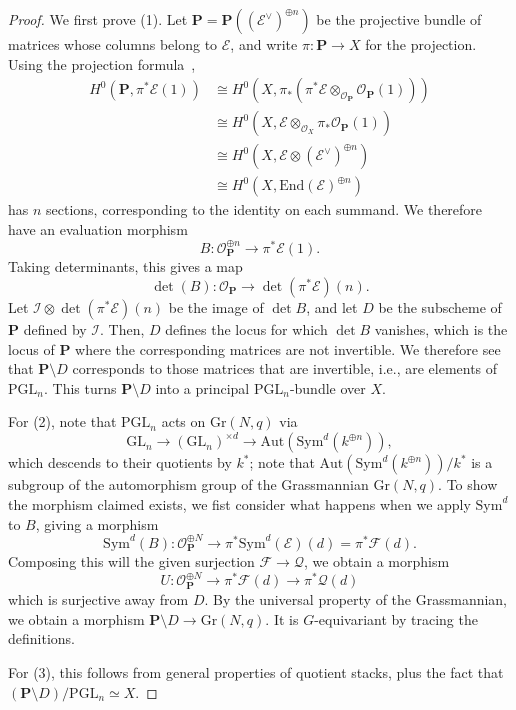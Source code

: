 \begin{proof}
We first prove (1).
Let $\mathbf{P} = \mathbf{P}((\mathcal{E}^\vee)^{\oplus n})$ be the projective
bundle of matrices whose columns belong to $\mathcal{E}$, and write
$\pi : \mathbf{P} \to X$ for the projection.
Using the projection formula~,
\begin{align*}
H^0(\mathbf{P}, \pi^*\mathcal{E}(1))
  & \cong H^0(X, \pi_*(\pi^*\mathcal{E} \otimes_{\mathcal{O}_{\mathbf{P}}}
      \mathcal{O}_{\mathbf{P}}(1))) \\
  & \cong H^0(X,\mathcal{E} \otimes_{\mathcal{O}_X}
      \pi_*\mathcal{O}_{\mathbf{P}}(1)) \\
  & \cong H^0(X,\mathcal{E} \otimes (\mathcal{E}^\vee)^{\oplus n}) \\
  & \cong H^0(X,\mathrm{End}(\mathcal{E})^{\oplus n})
\end{align*}
has $n$ sections, corresponding to the identity on each summand.
We therefore have an evaluation morphism
$$
B : \mathcal{O}_{\mathbf{P}}^{\oplus n} \longrightarrow \pi^*\mathcal{E}(1).
$$
Taking determinants, this gives a map
$$
\det(B) : \mathcal{O}_{\mathbf{P}} \longrightarrow \det(\pi^*\mathcal{E})(n).
$$
Let $\mathcal{I} \otimes \det(\pi^*\mathcal{E}) (n)$ be the image of $\det B$,
and let $D$ be the subscheme of $\mathbf{P}$ defined by $\mathcal{I}$.
Then, $D$ defines the locus for which $\det B$ vanishes, which is the locus of
$\mathbf{P}$ where the corresponding matrices are not invertible.
We therefore see that $\mathbf{P} \setminus D$ corresponds to those matrices
that are invertible, i.e., are elements of $\mathrm{PGL}_n$.
This turns $\mathbf{P} \setminus D$ into a principal $\mathrm{PGL}_n$-bundle
over $X$.

For (2), note that $\mathrm{PGL}_n$ acts on $\mathrm{Gr}(N,q)$ via
$$
  \mathrm{GL}_n \longrightarrow
  (\mathrm{GL}_n)^{\times d} \longrightarrow
  \mathrm{Aut}(\mathrm{Sym}^d (k^{\oplus n})),
$$
which descends to their quotients by $k^*$; note that
$\mathrm{Aut}(\mathrm{Sym}^d (k^{\oplus n}))/k^*$ is a subgroup of the
automorphism group of the Grassmannian $\mathrm{Gr}(N,q)$.
To show the morphism claimed exists, we fist consider what happens when we
apply $\mathrm{Sym}^d$ to $B$, giving a morphism
$$
  \mathrm{Sym}^d(B) : \mathcal{O}_{\mathbf{P}}^{\oplus N} \to
    \pi^*\mathrm{Sym}^d(\mathcal{E})(d) = \pi^*\mathcal{F}(d).
$$
Composing this will the given surjection $\mathcal{F} \to \mathcal{Q}$, we
obtain a morphism
$$
  U : \mathcal{O}_{\mathbf{P}}^{\oplus N} \to
        \pi^*\mathcal{F}(d) \to
        \pi^*\mathcal{Q}(d)
$$
which is surjective away from $D$.
By the universal property of the Grassmannian, we obtain a morphism
$\mathbf{P} \setminus D \to \mathrm{Gr}(N,q)$.
It is $G$-equivariant by tracing the definitions.

For (3), this follows from general properties of quotient stacks, plus the fact
that $(\mathbf{P} \setminus D)/\mathrm{PGL}_n \simeq X$.
\end{proof}

